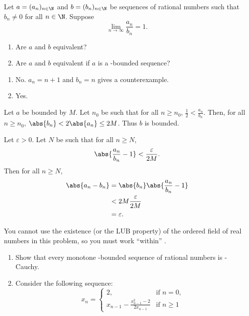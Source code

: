 \documentclass[12pt]{article}
\begin{document}
\begin{problem}
    Let $a = (a_n)_{n \in \N}$ and $b = (b_n)_{n \in \N}$ be sequences of
    rational numbers such that $b_n \ne 0$ for all $n \in \N$.
    Suppose \[
        \lim_{n \to \infty} \frac{a_n}{b_n} = 1.
    \]
    \begin{enumerate}
        \item Are $a$ and $b$ equivalent?
        \item Are $a$ and $b$ equivalent if $a$ is a \Q-bounded sequence?
    \end{enumerate}
\end{problem}
\begin{solution} \leavevmode
    \begin{enumerate}
        \item No. $a_n = n + 1$ and $b_n = n$ gives a counterexample.
        \item Yes.
    \end{enumerate}
    Let $a$ be bounded by $M$.
    Let $n_0$ be such that for all $n \ge n_0$, $\frac12 < \frac{a_n}{b_n}$.
    Then, for all $n \ge n_0$, $\abs{b_n} < 2 \abs{a_n} \le 2M$.
    Thus $b$ is bounded.

    Let $\varepsilon > 0$.
    Let $N$ be such that for all $n \ge N$, \[
        \abs{\frac{a_n}{b_n} - 1} < \frac{\varepsilon}{2M}.
    \] Then for all $n \ge N$, \begin{align*}
        \abs{a_n - b_n} &= \abs{b_n} \abs{\frac{a_n}{b_n} - 1} \\
                  &< 2M \frac{\varepsilon}{2M} \\
                  &= \varepsilon.
    \end{align*}
\end{solution}

\begin{problem}
    You cannot use the existence (or the LUB property) of the ordered field
    of real numbers in this problem, so you must work ``within'' \Q.
    \begin{enumerate}
        \item Show that every monotone \Q-bounded sequence of rational
        numbers is \Q-Cauchy.
        \item Consider the following sequence: \[
            x_n = \begin{cases}
                2, & \text{if } n = 0, \\
                x_{n-1} - \frac{x_{n-1}^2 - 2}{2 x_{n-1}} & \text{if } n \ge 1
            \end{cases}
        \]
    \end{enumerate}
\end{problem}
\end{document}
